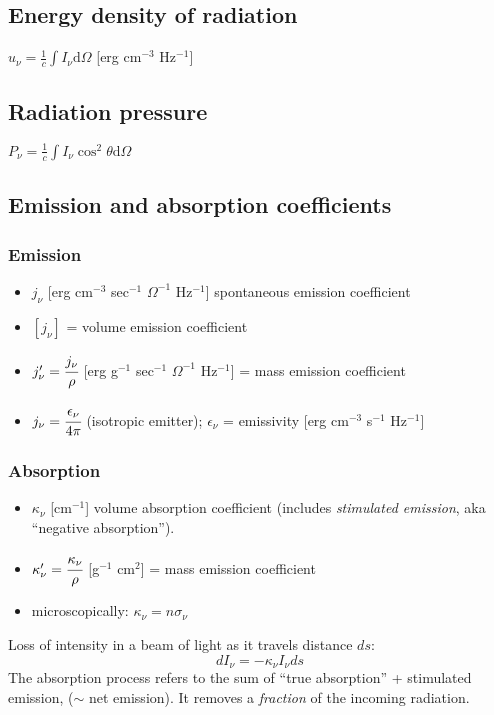 \documentclass[12pt]{article}
\begin{document}
\subsection{Energy density of radiation}
$u_{\nu} = \frac{1}{c}\int{I_{\nu}\mathrm{d}\Omega}$ [erg cm$^{-3}$
Hz$^{-1}$]
\subsection{Radiation pressure} $P_{\nu} =
\frac{1}{c}\int{I_{\nu}\cos^{2}\theta\mathrm{d}\Omega}$

\subsection{Emission and absorption coefficients}
\subsubsection{Emission}
\begin{itemize}
    \item $j_{\nu}$ [erg cm$^{-3}$ sec$^{-1}$ $\Omega^{-1}$ Hz$^{-1}$]
        spontaneous emission coefficient
    \item $[j_{\nu}]$ = volume emission coefficient
    \item $j'_{\nu} = \cfrac{j_{\nu}}{\rho}$ [erg g$^{-1}$ sec$^{-1}$ $\Omega^{-1}$ Hz$^{-1}$]
        = mass emission coefficient
    \item $j_{\nu} = \cfrac{\epsilon_{\nu}}{4\pi}$ (isotropic emitter);
        $\epsilon_{\nu}$ = emissivity [erg cm$^{-3}$ s$^{-1}$ Hz$^{-1}$]
\end{itemize}
\subsubsection{Absorption}
\begin{itemize}
    \item $\kappa_{\nu}$ [cm$^{-1}$] volume absorption coefficient (includes
        \emph{stimulated emission}, aka ``negative absorption'').
    \item $\kappa'_{\nu} = \cfrac{\kappa_{\nu}}{\rho}$ [g$^{-1}$ cm$^{2}$]
        = mass emission coefficient
    \item microscopically: $\kappa_{\nu} = n\sigma_{\nu}$
\end{itemize}
Loss of intensity in a beam of light as it travels distance $ds$:$${
    dI_{\nu} = -\kappa_{\nu}I_{\nu}ds
}$$
The absorption process refers to the sum of ``true absorption'' + stimulated emission,
($\sim$ net emission). It
removes a \emph{fraction} of the incoming radiation.
\end{document}
